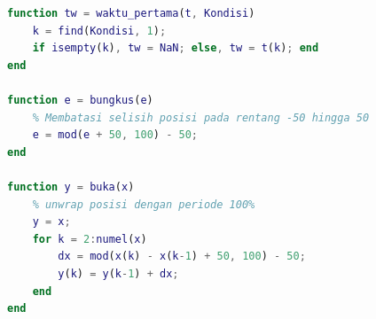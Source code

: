 \documentclass[11pt,a4paper]{article}
\begin{document}
\begin{lstlisting}[language=Matlab, morekeywords={readmatrix,stairs}, caption={Skrip MATLAB \texttt{analisis\_kontrol\_posisi.m}},label={lst:analisis}]
function tw = waktu_pertama(t, Kondisi)
    k = find(Kondisi, 1);
    if isempty(k), tw = NaN; else, tw = t(k); end
end

function e = bungkus(e)
    % Membatasi selisih posisi pada rentang -50 hingga 50
    e = mod(e + 50, 100) - 50;
end

function y = buka(x)
    % unwrap posisi dengan periode 100%
    y = x;
    for k = 2:numel(x)
        dx = mod(x(k) - x(k-1) + 50, 100) - 50;
        y(k) = y(k-1) + dx;
    end
end
\end{lstlisting}
\end{document}
